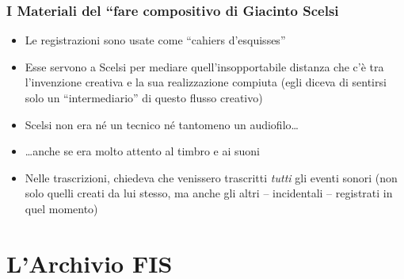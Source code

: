 \documentclass[compress,xcolor=dvipsnames]{beamer}
\newcommand{\Scelsi}{Giacinto Scelsi\xspace}
\begin{document}
\begin{frame}
	\frametitle[Materiali]{I Materiali del ``fare compositivo di \Scelsi}

  \begin{itemize}%

      \item Le registrazioni sono usate come ``cahiers d'esquisses'' 

      \item Esse servono a Scelsi per mediare quell'insopportabile distanza
          che c'\`e tra l'invenzione creativa e la sua realizzazione compiuta
          (egli diceva di sentirsi solo un
          ``intermediario'' di questo flusso creativo)

      \item Scelsi non era n\'e un tecnico n\'e tantomeno un audiofilo\dots

      \item \dots anche se era molto attento al timbro e ai suoni

      \item Nelle trascrizioni, chiedeva che venissero trascritti \emph{tutti}
          gli eventi sonori (non solo quelli
          creati da lui stesso, ma anche gli altri -- incidentali --
          registrati in quel momento)

  \end{itemize}

\end{frame}

\section{L'Archivio FIS}
\end{document}
